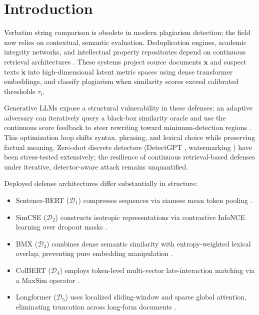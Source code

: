 \documentclass[conference,onecolumn,11pt]{IEEEtran}
\begin{document}
\section{Introduction}

Verbatim string comparison is obsolete in modern plagiarism detection; the field now relies on contextual, semantic evaluation. Deduplication engines, academic integrity networks, and intellectual property repositories depend on continuous retrieval architectures \cite{devlin2019bert, reimers2019sbert, gao2021simcse}. These systems project source documents $\mathbf{x}$ and suspect texts $\mathbf{\tilde{x}}$ into high-dimensional latent metric spaces using dense transformer embeddings, and classify plagiarism when similarity scores exceed calibrated thresholds $\tau_i$.

Generative LLMs expose a structural vulnerability in these defenses: an adaptive adversary can iteratively query a black-box similarity oracle and use the continuous score feedback to steer rewriting toward minimum-detection regions \cite{waghela2024sassp, zha2025padben}. This optimization loop shifts syntax, phrasing, and lexical choice while preserving factual meaning. Zero-shot discrete detectors (DetectGPT \cite{mitchell2023detectgpt}, watermarking \cite{kirchenbauer2023watermark}) have been stress-tested extensively; the resilience of continuous retrieval-based defenses under iterative, detector-aware attack remains unquantified.

Deployed defense architectures differ substantially in structure:
\begin{itemize}
    \item Sentence-BERT ($\mathcal{D}_1$) compresses sequences via siamese mean token pooling \cite{reimers2019sbert}.
    \item SimCSE ($\mathcal{D}_2$) constructs isotropic representations via contrastive InfoNCE learning over dropout masks \cite{gao2021simcse}.
    \item BMX ($\mathcal{D}_3$) combines dense semantic similarity with entropy-weighted lexical overlap, preventing pure embedding manipulation \cite{li2024bmx, robertson2009bm25}.
    \item ColBERT ($\mathcal{D}_4$) employs token-level multi-vector late-interaction matching via a MaxSim operator \cite{khattab2020colbert, mysore2022scientific}.
    \item Longformer ($\mathcal{D}_5$) uses localized sliding-window and sparse global attention, eliminating truncation across long-form documents \cite{beltagy2020longformer, jha2023longform}.
\end{itemize}
\end{document}
